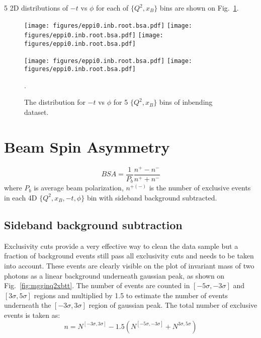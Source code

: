 5 2D distributions of $-t$ vs $\phi$ for each of $\{Q^2,x_B\}$ bins are shown on Fig.~\ref{fig:tphibins}.


\begin{figure}[hbt]
	\centering
	\texttt{[image: figures/eppi0.inb.root.bsa.pdf]}
	\texttt{[image: figures/eppi0.inb.root.bsa.pdf]}
	\texttt{[image: figures/eppi0.inb.root.bsa.pdf]}

	\texttt{[image: figures/eppi0.inb.root.bsa.pdf]}
	\texttt{[image: figures/eppi0.inb.root.bsa.pdf]}

	\caption{The distribution for $-t$ vs $\phi$ for 5 $\{Q^2,x_B\}$ bins of inbending dataset.}.
	\label{fig:tphibins}
\end{figure}


\section{Beam Spin Asymmetry}

\begin{equation}
	BSA=\frac{1}{P_b}\frac{n^+-n^-}{n^++n^-}
\end{equation}
where $P_b$ is average beam polarization, $n^{+(-)}$ is the number of exclusive events in each 4D $\{Q^2,x_B,-t,\phi\}$ bin with sideband background subtracted.

\subsection{Sideband background subtraction}

Exclusivity cuts provide a very effective way to clean the data sample but a fraction of background events still pass all exclusivity cuts and needs to be taken into account.
These events are clearly visible on the plot of invariant mass of two photons as a linear background underneath gaussian peak, as shown on Fig.~\ref{fig:mgginq2xbtt}.
The number of events are counted in $[-5\sigma,-3\sigma]$ and $[3\sigma,5\sigma]$ regions and multiplied by 1.5 to estimate the number of events underneath the $[-3\sigma,3\sigma]$ region of gaussian peak.
The total number of exclusive events is taken as:
\begin{equation}
	n=N^{[-3\sigma,3\sigma]}-1.5\left(N^{[-5\sigma,-3\sigma]}+N^{3\sigma,5\sigma}\right)
\end{equation}

